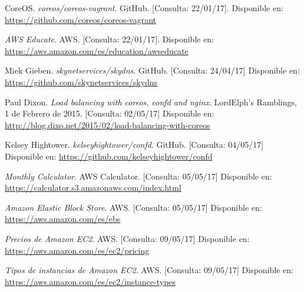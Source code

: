 \begin{thebibliography}{9}
CoreOS.
\textit{coreos/coreos-vagrant}. GitHub. [Consulta: 22/01/17].
Disponible en: \url{https://github.com/coreos/coreos-vagrant}

\textit{AWS Educate}. AWS. [Consulta: 22/01/17].
Disponible en: \url{https://aws.amazon.com/es/education/awseducate}

Miek Gieben.
\textit{skynetservices/skydns}. GitHub. [Consulta: 24/04/17]
Disponible en: \url{https://github.com/skynetservices/skydns}

Paul Dixon.
\textit{Load balancing with coreos, confd and nginx}. 
LordElph's Ramblings, 1 de Febrero de 2015. [Consulta: 02/05/17]
Disponible en: \url{http://blog.dixo.net/2015/02/load-balancing-with-coreos}

Kelsey Hightower.
\textit{kelseyhightower/confd}. GitHub. [Consulta: 04/05/17]
Disponible en: \url{https://github.com/kelseyhightower/confd}

\textit{Monthly Calculator}. 
AWS Calculator. [Consulta: 05/05/17]
Disponible en: \url{https://calculator.s3.amazonaws.com/index.html}

\textit{Amazon Elastic Block Store}. 
AWS. [Consulta: 05/05/17]
Disponible en: \url{https://aws.amazon.com/es/ebs}

\textit{Precios de Amazon EC2}. 
AWS. [Consulta: 09/05/17]
Disponible en: \url{https://aws.amazon.com/es/ec2/pricing}

\textit{Tipos de instancias de Amazon EC2}. 
AWS. [Consulta: 09/05/17]
Disponible en: \url{https://aws.amazon.com/es/ec2/instance-types}


\end{thebibliography}